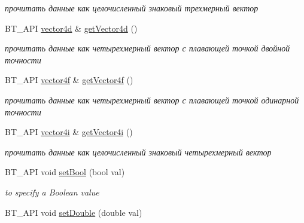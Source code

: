 \begin{DoxyCompactItemize}
\begin{DoxyCompactList}\small\item\em прочитать данные как целочисленный знаковый трехмерный вектор \end{DoxyCompactList}\item 
\hypertarget{classbt_1_1_variant_a75f2b97e880960a45b94d13ede60304e}{B\-T\-\_\-\-A\-P\-I \hyperlink{classbt_1_1vector4d}{vector4d} \& \hyperlink{classbt_1_1_variant_a75f2b97e880960a45b94d13ede60304e}{get\-Vector4d} ()}\label{classbt_1_1_variant_a75f2b97e880960a45b94d13ede60304e}

\begin{DoxyCompactList}\small\item\em прочитать данные как четырехмерный вектор с плавающей точкой двойной точности \end{DoxyCompactList}\item 
\hypertarget{classbt_1_1_variant_a13bd151c73a9d51dfbc603ccce88dec1}{B\-T\-\_\-\-A\-P\-I \hyperlink{classbt_1_1vector4f}{vector4f} \& \hyperlink{classbt_1_1_variant_a13bd151c73a9d51dfbc603ccce88dec1}{get\-Vector4f} ()}\label{classbt_1_1_variant_a13bd151c73a9d51dfbc603ccce88dec1}

\begin{DoxyCompactList}\small\item\em прочитать данные как четырехмерный вектор с плавающей точкой одинарной точности \end{DoxyCompactList}\item 
\hypertarget{classbt_1_1_variant_a11959bc0bc752a3913a0ae9666ae1ea2}{B\-T\-\_\-\-A\-P\-I \hyperlink{classbt_1_1vector4i}{vector4i} \& \hyperlink{classbt_1_1_variant_a11959bc0bc752a3913a0ae9666ae1ea2}{get\-Vector4i} ()}\label{classbt_1_1_variant_a11959bc0bc752a3913a0ae9666ae1ea2}

\begin{DoxyCompactList}\small\item\em прочитать данные как целочисленный знаковый четырехмерный вектор \end{DoxyCompactList}\item 
\hypertarget{classbt_1_1_variant_ad55c92fcfd7d6a7bfb9bf4c42c0c6a0d}{B\-T\-\_\-\-A\-P\-I void \hyperlink{classbt_1_1_variant_ad55c92fcfd7d6a7bfb9bf4c42c0c6a0d}{set\-Bool} (bool val)}\label{classbt_1_1_variant_ad55c92fcfd7d6a7bfb9bf4c42c0c6a0d}

\begin{DoxyCompactList}\small\item\em to specify a Boolean value \end{DoxyCompactList}\item 
\hypertarget{classbt_1_1_variant_ae25b4cb795ce15c880a58b5d5b9f2525}{B\-T\-\_\-\-A\-P\-I void \hyperlink{classbt_1_1_variant_ae25b4cb795ce15c880a58b5d5b9f2525}{set\-Double} (double val)}\label{classbt_1_1_variant_ae25b4cb795ce15c880a58b5d5b9f2525}


\end{DoxyCompactItemize}
